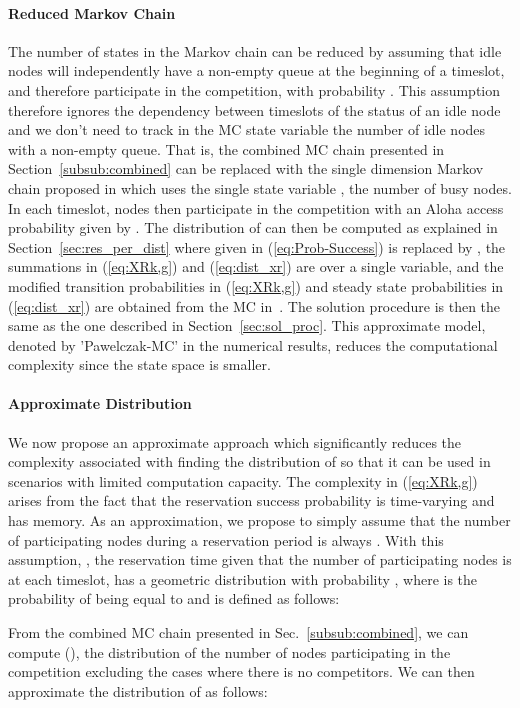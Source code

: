 \documentclass[12pt,journal,oneside,onecolumn]{IEEEtran}
\begin{document}
\paragraph{Reduced Markov Chain}
The number of states in the Markov chain can be reduced by assuming
that idle nodes will independently have a non-empty queue at the beginning of
a timeslot, and therefore participate in the competition, with probability .
This assumption therefore ignores the dependency between timeslots of the
status of an idle node and we don't need to track in the MC state variable
the number of idle nodes with a non-empty queue. That is, the combined MC chain presented
in Section~\ref{subsub:combined} can be replaced with the single dimension 
Markov chain proposed in \cite{pawelczak09} which uses the single state variable , the number
of busy nodes. 
In each timeslot,  nodes then participate in the competition with an
Aloha access probability given by . 
The distribution of  can then be computed as explained in Section~\ref{sec:res_per_dist}  where
 given in (\ref{eq:Prob-Success}) is replaced by ,
the summations in (\ref{eq:XRk,g}) and (\ref{eq:dist_xr}) are over a single variable, and the modified transition probabilities in (\ref{eq:XRk,g}) and
steady state probabilities in (\ref{eq:dist_xr}) are obtained from the MC in~\cite{pawelczak09}.  
The solution procedure is then the same as the one described in Section~\ref{sec:sol_proc}.
This approximate model, denoted by 'Pawelczak-MC' in the numerical results, reduces the computational complexity since the state space is smaller.

\paragraph{Approximate  Distribution}
\label{Avg}
We now propose an approximate approach which significantly reduces the complexity associated with finding
the distribution of  so that it can be used in scenarios with limited computation capacity. 
The  complexity in (\ref{eq:XRk,g}) arises from the fact that the reservation success probability is time-varying
and has memory. As an approximation, we propose to simply assume that the number of participating nodes during a reservation period is always
.  With this assumption, , the reservation time given that the number of participating nodes is  at each timeslot,
has a geometric distribution with probability 
,
where  is the probability of  being equal to  and is defined as follows:

From the combined MC chain presented in Sec.~\ref{subsub:combined}, we can compute
 (), the distribution of the number of nodes participating in the competition
excluding the cases where there is no competitors. We can then approximate the distribution of  as follows:
\end{document}
